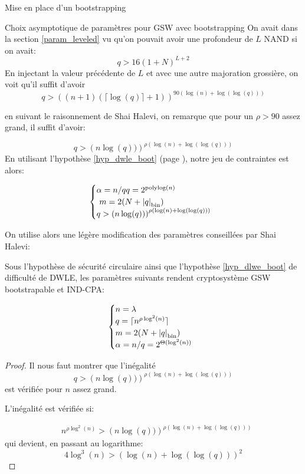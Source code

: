 \begin{section}{Mise en place d'un bootstrapping}
\begin{subsection}{Choix asymptotique de paramètres pour GSW avec bootstrapping}
On avait dans la section \ref{param_leveled} vu qu'on pouvait avoir une
profondeur de $L$ NAND si on avait: 
\begin{equation}
q > 16 {(1+N)}^{L+2}
\end{equation}
En injectant la valeur précédente de $L$ et avec une autre majoration
grossière, on voit qu'il suffit d'avoir
\begin{equation}
q > {\left((n+1)(\lceil \log(q) \rceil + 1 )\right)}^{90 \left(\log(n) +
\log(\log(q))\right)}
\end{equation}

en suivant le raisonnement de Shai Halevi, on remarque 
que pour un $\rho > 90$ assez grand, il suffit d'avoir:

\begin{equation}
q > {\left(n\log(q))\right)}^{\rho \left(\log(n) + \log(\log(q))\right)}
\end{equation}
En utilisant l'hypothèse  \ref{hyp_dwle_boot} (page \pageref{hyp_dwle_boot}), notre jeu de contraintes est alors:

\[ \begin{cases}
\alpha  = n /q
	q = 2^\text{polylog$(n)$}\\ 
	m = 2(N + \bnorm{q}) \\  
	q > {\left(n\log(q))\right)}^{\rho \left(\log(n) + \log(\log(q))\right)}
	\end{cases} \]

On utilise alors une légère modification des paramètres conseillées par Shai Halevi:
\begin{thm}
Sous l'hypothèse de sécurité circulaire ainsi que l'hypothèse \ref{hyp_dlwe_boot} de difficulté de DWLE, les paramètres suivants rendent cryptosystème GSW bootstrapable et IND-CPA:

\[ \begin{cases}
 	n = \lambda \\
	q = \lceil n^{\rho \log^2(n)}\rceil \\
	m = 2(N + \bnorm{q}) \\  
	\alpha = n/q = 2^{\Theta(\log^2(n))}
	\end{cases} \]
\end{thm}
\begin{proof}
Il nous faut montrer que l'inégalité 
	\[ q > {\left(n\log(q))\right)}^{\rho \left(\log(n) +
	\log(\log(q))\right)} \]
est vérifiée pour $n$ assez grand.

L'inégalité est vérifiée si:

	\begin{align*} &n^{\rho \log^2(n)} > {\left(n\log(q))\right)}^{\rho \left(\log(n) +
	\log(\log(q))\right)}\end{align*}
qui devient, en passant au logarithme:
\[ 4 \log^3(n) > {(\log(n) + \log(\log(q)))}^2 \]


\end{proof}
\end{subsection}
\end{section}
